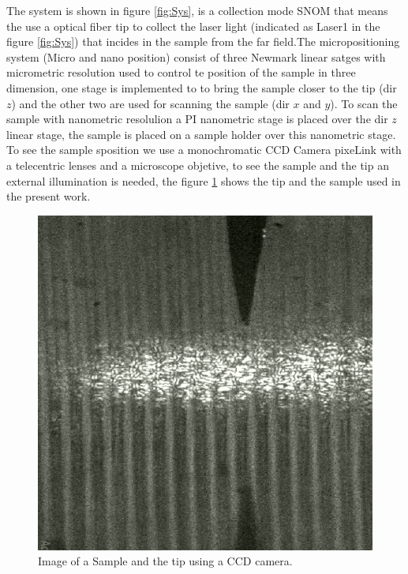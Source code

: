 \documentclass[reprint,aps,prb,citeautoscript,altaffilletter]{revtex4-2}
\begin{document}
	The system is shown in figure \ref{fig:Sys}, is a collection mode SNOM that means  the use a optical fiber tip to collect the laser light (indicated as Laser1 in the figure \ref{fig:Sys}) that incides in the sample from the far field.The micropositioning system (Micro and nano position) consist of three Newmark linear satges  with micrometric resolution used to control te position of the sample in three dimension, one stage is implemented to to bring the sample closer to the tip (dir $z$) and the other two are used for  scanning the sample (dir $x$ and $y$).
	To scan the sample with nanometric resolulion a PI nanometric stage is placed over the dir $z$ linear stage, the sample is placed on a sample holder over this nanometric stage. To see the sample sposition we use a monochromatic CCD Camera pixeLink with a telecentric lenses and a microscope objetive, to see the sample and the tip an external illumination is needed, the figure \ref{fig:ts} shows the tip and the sample used in the present work. 
	\begin{figure}[!hbt]
		\centering
		\includegraphics[scale=0.5]{figures/tipSample.pdf}

		\caption{Image of a Sample and the tip using a CCD camera.}
		\label{fig:ts}
	\end{figure}
\end{document}
